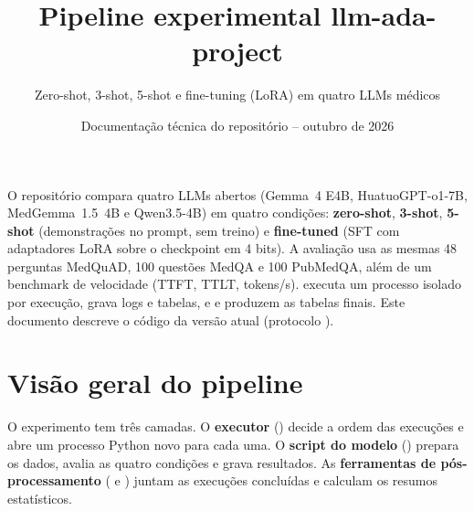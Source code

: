 \documentclass[11pt]{article}
\title{Pipeline experimental llm-ada-project}
\author{Zero-shot, 3-shot, 5-shot e fine-tuning (LoRA) em quatro LLMs médicos}
\date{Documentação técnica do repositório -- outubro de 2026}
\begin{document}
\thispagestyle{plain}
\maketitle

\begin{bloco}[Resumo]
O repositório compara quatro LLMs abertos (Gemma~4 E4B, HuatuoGPT-o1-7B, MedGemma~1.5~4B e Qwen3.5-4B) em quatro condições:
\textbf{zero-shot}, \textbf{3-shot}, \textbf{5-shot} (demonstrações no prompt, sem treino) e \textbf{fine-tuned} (SFT com adaptadores LoRA sobre o checkpoint em 4 bits).
A avaliação usa as mesmas 48 perguntas MedQuAD, 100 questões MedQA e 100 PubMedQA, além de um benchmark de velocidade (TTFT, TTLT, tokens/s).
 executa um processo isolado por execução,  grava logs e tabelas, e  e  produzem as tabelas finais.
Este documento descreve o código da versão atual (protocolo ).
\end{bloco}

\tableofcontents

\section{Visão geral do pipeline}

O experimento tem três camadas. O \textbf{executor} () decide a ordem das execuções e abre um processo Python novo para cada uma.
O \textbf{script do modelo} () prepara os dados, avalia as quatro condições e grava resultados.
As \textbf{ferramentas de pós-processamento} ( e ) juntam as execuções concluídas e calculam os resumos estatísticos.
\end{document}
